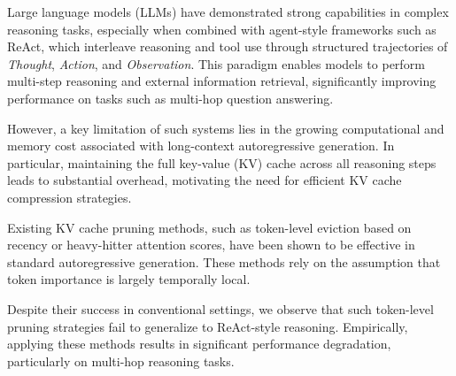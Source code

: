 \documentclass[11pt]{article}
\begin{document}
Large language models (LLMs) have demonstrated strong capabilities in complex reasoning tasks, especially when combined with agent-style frameworks such as ReAct, which interleave reasoning and tool use through structured trajectories of \textit{Thought}, \textit{Action}, and \textit{Observation}. This paradigm enables models to perform multi-step reasoning and external information retrieval, significantly improving performance on tasks such as multi-hop question answering.

However, a key limitation of such systems lies in the growing computational and memory cost associated with long-context autoregressive generation. In particular, maintaining the full key-value (KV) cache across all reasoning steps leads to substantial overhead, motivating the need for efficient KV cache compression strategies.

Existing KV cache pruning methods, such as token-level eviction based on recency or heavy-hitter attention scores, have been shown to be effective in standard autoregressive generation. These methods rely on the assumption that token importance is largely temporally local.

Despite their success in conventional settings, we observe that such token-level pruning strategies fail to generalize to ReAct-style reasoning. Empirically, applying these methods results in significant performance degradation, particularly on multi-hop reasoning tasks.
\end{document}
